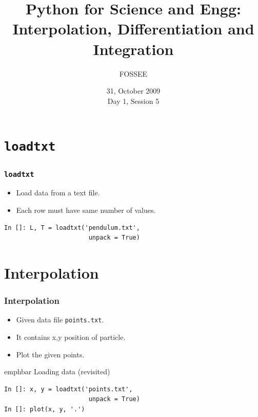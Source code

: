 \documentclass[14pt,compress]{beamer}
\title[Calculus]{Python for Science and Engg: Interpolation, Differentiation and Integration}
\author[FOSSEE] {FOSSEE}
\institute[IIT Bombay] {Department of Aerospace Engineering\\IIT Bombay}
\date[] {31, October 2009\\Day 1, Session 5}
\newcommand{\emphbar}[1]
{\begin{beamercolorbox}[rounded=true]{emphbar} 
      {#1}
 \end{beamercolorbox}
}
\newcommand{\typ}[1]{\lstinline{#1}}
\begin{document}
\begin{frame}
  \titlepage
\end{frame}



\section{\typ{loadtxt}}

\begin{frame}[fragile]
  \frametitle{\typ{loadtxt}}
  \begin{itemize}
  \item Load data from a text file.
  \item Each row must have same number of values.
  \end{itemize}
\begin{lstlisting}
In []: L, T = loadtxt('pendulum.txt', 
                       unpack = True)
\end{lstlisting}
\end{frame}


\section{Interpolation}
\begin{frame}[fragile]
\frametitle{Interpolation}
\begin{itemize}
  \item Given data file \typ{points.txt}.
  \item It contains x,y position of particle.
  \item Plot the given points.
\end{itemize}
\emphbar{Loading data (revisited)}
\begin{lstlisting}
In []: x, y = loadtxt('points.txt',
                       unpack = True)
In []: plot(x, y, '.')
\end{lstlisting}
\end{frame}
\end{document}
